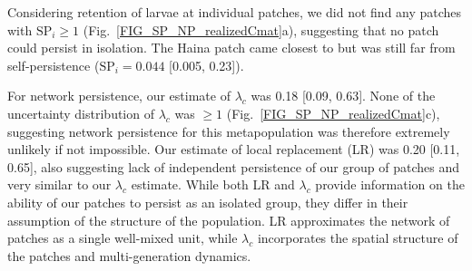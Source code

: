 \documentclass[12pt, oneside]{article}   	%
\begin{document}
Considering retention of larvae at individual patches, we did not find any patches with $\text{SP}_{i} \geq 1$ (Fig.\ \ref{FIG_SP_NP_realizedCmat}a), suggesting that no patch could persist in isolation. The Haina patch came closest to but was still far from self-persistence ($\text{SP}_i = 0.044$ [0.005, 0.23]). %



For network persistence, our estimate of $\lambda_{c}$ was 0.18 [0.09, 0.63]. None of the uncertainty distribution of $\lambda_c$ was $\geq 1$ (Fig.\ \ref{FIG_SP_NP_realizedCmat}c), suggesting network persistence for this metapopulation was therefore extremely unlikely if not impossible. Our estimate of local replacement (LR) was 0.20 [0.11, 0.65], also suggesting lack of independent persistence of our group of patches and very similar to our $\lambda_{c}$ estimate. While both LR and $\lambda_{c}$ provide information on the ability of our patches to persist as an isolated group, they differ in their assumption of the structure of the population. LR approximates the network of patches as a single well-mixed unit, while $\lambda_{c}$ incorporates the spatial structure of the patches and multi-generation dynamics. 
\end{document}
